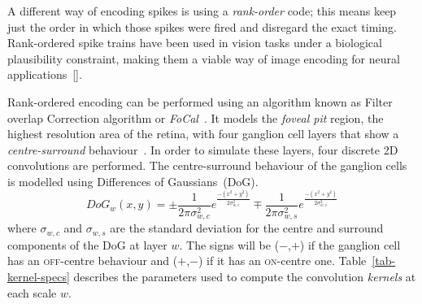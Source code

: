 A different way of encoding spikes is using a \emph{rank-order} code; this means
keep just the order in which those spikes were fired and disregard the exact timing. Rank-ordered spike trains have been used in vision tasks under a biological plausibility constraint, making them a viable way of image encoding for neural applications~[\cite{van-rullen-rate-coding,basab-model,Masmoudi2010}].

Rank-ordered encoding can be performed using an algorithm known as 
{Filter overlap Correction algorithm} or \textit{FoCal}~\citep{basab-model}. It models the \emph{foveal pit} region, the highest resolution area of the retina, with four ganglion cell layers that show a \emph{centre-surround} behaviour~\citep{Kolb2003}. In order to simulate these layers, four discrete 2D convolutions are performed. The centre-surround behaviour of the ganglion cells is modelled using Differences of Gaussians~(DoG). 
\begin{equation}
\label{eq-dog}
DoG_w(x,y) = \pm\frac{1}{2\pi\sigma_{w,c}^2}e^{\frac{-(x^2 + y^2)}{2\sigma_{w,c}^2}}
\mp\frac{1}{2\pi\sigma_{w,s}^2}e^{\frac{-(x^2 + y^2)}{2\sigma_{w,s}^2}}
\end{equation}
where $\sigma_{w,c}$ and $\sigma_{w,s}$ are the standard deviation for the 
centre and surround components of the DoG at layer $w$. The signs 
will be ($-$,$+$) if the ganglion cell has an \textsc{off}-centre behaviour and 
($+$,$-$) if it has an \textsc{on}-centre one. Table~\ref{tab-kernel-specs} 
describes the parameters used to compute the convolution \emph{kernels} at each 
scale $w$.

